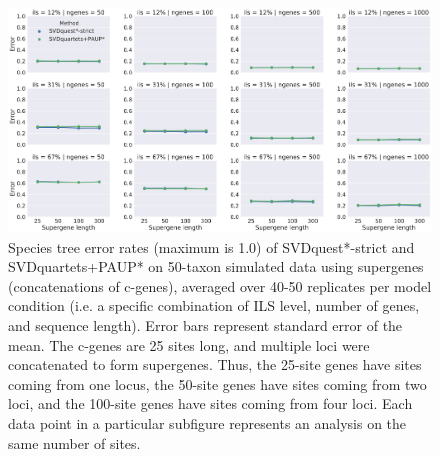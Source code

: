 \clearpage
\begin{figure}
  \centering
  \includegraphics[width=\textwidth]{svdquest-figs/binned_rfdists_paup.pdf}
  \caption[Species tree error rates of SVDquest*-strict and SVDquartets+PAUP* on 50-taxon supergene datasets]{Species tree error rates (maximum is 1.0) of SVDquest*-strict and SVDquartets+PAUP* on 50-taxon simulated data using 
    supergenes (concatenations of c-genes), averaged over 40-50
    replicates per model condition (i.e. a specific combination of ILS level, number of genes, and sequence length). Error bars represent standard error of the mean. The c-genes are 25 sites long, and multiple loci were
    concatenated to form supergenes. Thus, the 
    25-site genes have sites coming from one locus, the 50-site genes have
    sites coming from two loci, and the 100-site genes have sites coming
    from four loci. Each data point in a particular subfigure represents
    an analysis on the same number of sites.
  }
  \label{fig:s9}
\end{figure}

\clearpage

